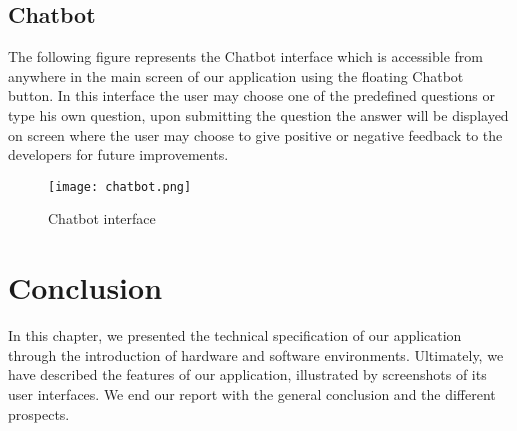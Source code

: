 \subsection{Chatbot}
The following figure represents the Chatbot interface which is accessible from anywhere in the main screen of our application using the floating Chatbot button. In this interface the user may choose one of the predefined questions or type his own question, upon submitting the question the answer will be displayed on screen where the user may choose to give positive or negative feedback to the developers for future improvements.

\begin{figure}[H]%
    \center   
    
    \texttt{[image: chatbot.png]}
    \caption{Chatbot interface}
\end{figure}
\section*{Conclusion}
In this chapter, we presented the technical specification of our
application through the introduction of hardware and software environments. Ultimately,
we have described the features of our application,
illustrated by screenshots of its user interfaces.
We end our report with the general conclusion and the different
prospects.